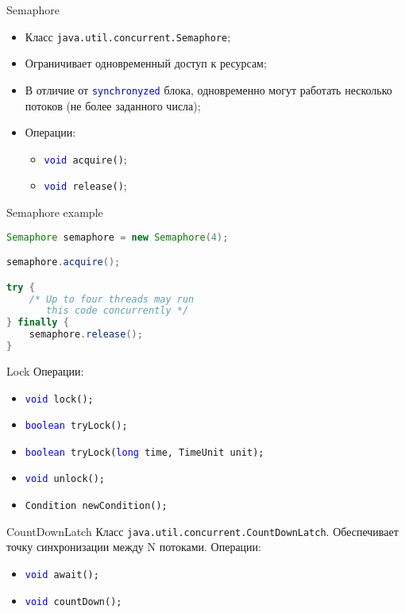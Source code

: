 \begin{frame}{Semaphore}
\begin{itemize}
    \item Класс \texttt{java.util.concurrent.Semaphore};
    \item Ограничивает одновременный доступ к ресурсам;
    \item В отличие от \textcolor{blue}{\texttt{synchronyzed}} блока, одновременно могут работать несколько потоков (не более заданного числа);
    \item Операции:
    \begin{itemize}
        \item \texttt{\textcolor{blue}{void} acquire()};
        \item \texttt{\textcolor{blue}{void} release()};
    \end{itemize}
\end{itemize}
\end{frame}

\begin{frame}[fragile]{Semaphore example}
\begin{lstlisting}[language=Java]
Semaphore semaphore = new Semaphore(4);

semaphore.acquire();

try {
    /* Up to four threads may run
       this code concurrently */
} finally {
    semaphore.release();
}
\end{lstlisting}
\end{frame}

\begin{frame}{Lock}
Операции:
\begin{itemize}
    \item \texttt{\textcolor{blue}{void} lock();}
    \item \texttt{\textcolor{blue}{boolean} tryLock();}
    \item \texttt{\textcolor{blue}{boolean} tryLock(\textcolor{blue}{long} time, TimeUnit unit);}
    \item \texttt{\textcolor{blue}{void} unlock();}
    \item \texttt{Condition newCondition();}
\end{itemize}
\end{frame}

\begin{frame}{CountDownLatch}
Класс \texttt{java.util.concurrent.CountDownLatch}.
\vfill
Обеспечивает точку синхронизации между N потоками.
\vfill
Операции:
\begin{itemize}
    \item \texttt{\textcolor{blue}{void} await();}
    \item \texttt{\textcolor{blue}{void} countDown();}
\end{itemize}
\end{frame}

